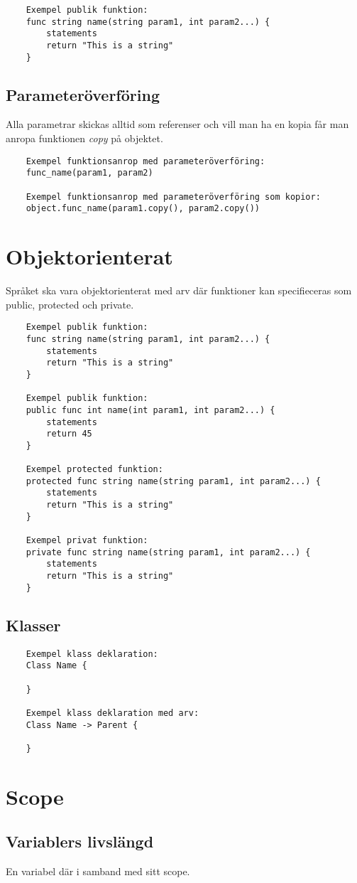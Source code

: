 \documentclass{TDP003mall}
\begin{document}
    \begin{verbatim}
    Exempel publik funktion:
    func string name(string param1, int param2...) {
        statements
        return "This is a string"
    }  
\end{verbatim}
    
    \subsection{Parameteröverföring}
    Alla parametrar skickas alltid som referenser och vill man ha en kopia får man anropa funktionen \emph{copy} på objektet.

\begin{verbatim}
    Exempel funktionsanrop med parameteröverföring:
    func_name(param1, param2)

    Exempel funktionsanrop med parameteröverföring som kopior:
    object.func_name(param1.copy(), param2.copy())
\end{verbatim}

    \section{Objektorienterat}
    Språket ska vara objektorienterat med arv där funktioner kan specifieceras som public, protected och private.

    \begin{verbatim}
    Exempel publik funktion:
    func string name(string param1, int param2...) {
        statements
        return "This is a string"
    } 

    Exempel publik funktion: 
    public func int name(int param1, int param2...) { 
        statements
        return 45 
    } 

    Exempel protected funktion: 
    protected func string name(string param1, int param2...) { 
        statements
        return "This is a string"
    } 

    Exempel privat funktion: 
    private func string name(string param1, int param2...) { 
        statements
        return "This is a string"
    } 
\end{verbatim}
    \subsection{Klasser}
        \begin{verbatim}
    Exempel klass deklaration:
    Class Name {
      
    }

    Exempel klass deklaration med arv:
    Class Name -> Parent {
      
    }
\end{verbatim}

    \section{Scope}

    \subsection{Variablers livslängd}
    En variabel där i samband med sitt scope.
 
\end{document}

